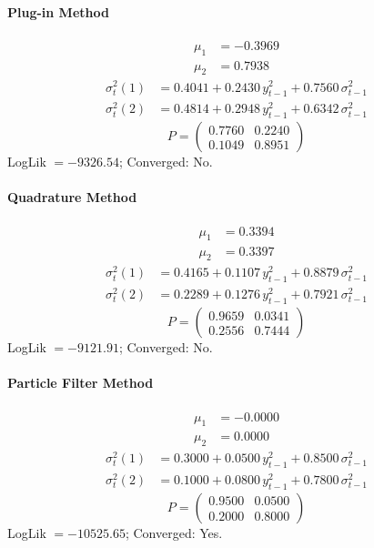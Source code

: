 \documentclass[11pt, a4paper]{article}
\begin{document}
\paragraph{Plug-in Method}
\begin{align}
\mu_{1} &= -0.3969 \\
\mu_{2} &= 0.7938
\end{align}
\begin{align}
\sigma^2_{t}(1) &= 0.4041 + 0.2430\, y_{t-1}^2 + 0.7560\, \sigma^2_{t-1} \\
\sigma^2_{t}(2) &= 0.4814 + 0.2948\, y_{t-1}^2 + 0.6342\, \sigma^2_{t-1}
\end{align}
\begin{equation}
P = \begin{pmatrix} 0.7760 & 0.2240 \\ 0.1049 & 0.8951 \end{pmatrix}
\end{equation}
LogLik $= -9326.54$; Converged: No.

\paragraph{Quadrature Method}
\begin{align}
\mu_{1} &= 0.3394 \\
\mu_{2} &= 0.3397
\end{align}
\begin{align}
\sigma^2_{t}(1) &= 0.4165 + 0.1107\, y_{t-1}^2 + 0.8879\, \sigma^2_{t-1} \\
\sigma^2_{t}(2) &= 0.2289 + 0.1276\, y_{t-1}^2 + 0.7921\, \sigma^2_{t-1}
\end{align}
\begin{equation}
P = \begin{pmatrix} 0.9659 & 0.0341 \\ 0.2556 & 0.7444 \end{pmatrix}
\end{equation}
LogLik $= -9121.91$; Converged: No.

\paragraph{Particle Filter Method}
\begin{align}
\mu_{1} &= -0.0000 \\
\mu_{2} &= 0.0000
\end{align}
\begin{align}
\sigma^2_{t}(1) &= 0.3000 + 0.0500\, y_{t-1}^2 + 0.8500\, \sigma^2_{t-1} \\
\sigma^2_{t}(2) &= 0.1000 + 0.0800\, y_{t-1}^2 + 0.7800\, \sigma^2_{t-1}
\end{align}
\begin{equation}
P = \begin{pmatrix} 0.9500 & 0.0500 \\ 0.2000 & 0.8000 \end{pmatrix}
\end{equation}
LogLik $= -10525.65$; Converged: Yes.
\end{document}

